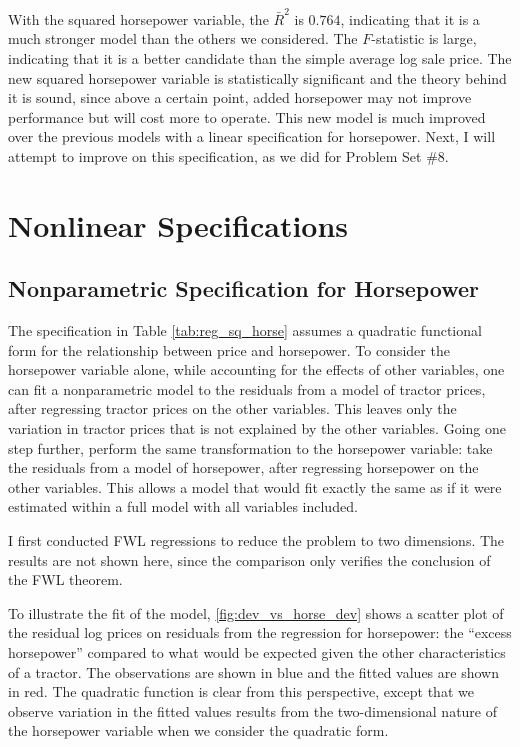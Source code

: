With the squared horsepower variable, the $\bar{R}^2$ is $0.764$, indicating that it is a much stronger model than the others we considered. 
The $F$-statistic is large, indicating that it is a better candidate than the simple average log sale price. 
The new squared horsepower variable is statistically significant and the theory behind it is sound, since above a certain point, added horsepower may not improve performance but will cost more to operate. 
This new model is much improved over the previous models with a linear specification for horsepower.
Next, I will attempt to improve on this specification, 
as we did for Problem Set \#8. 





\clearpage
\section{Nonlinear Specifications}


\subsection{Nonparametric Specification for Horsepower}


The specification in 
Table \ref{tab:reg_sq_horse}
assumes a quadratic functional form for
the relationship between price and horsepower. 
To consider the horsepower variable alone, 
while accounting for the effects of other variables, 
one can fit a nonparametric model to the residuals 
from a model of tractor prices, 
after regressing tractor prices on the other variables. 
This leaves only the variation in tractor prices that is not explained by the other variables. 
Going one step further, perform the same transformation to the horsepower variable:
take the residuals from a model of horsepower, 
after regressing horsepower on the other variables. 
This allows a model that would fit exactly the same as if it were estimated within a full model with all variables included. 

I first conducted FWL regressions 
to reduce the problem to two dimensions. 
The results are not shown here, 
since the comparison only verifies 
the conclusion of the FWL theorem. 


To illustrate the fit of the model, 
\ref{fig:dev_vs_horse_dev} 
shows a scatter plot 
of the residual log prices on 
residuals from the regression for horsepower:
the ``excess horsepower'' compared to what would be 
expected given the other characteristics of a tractor. 
The observations are shown in blue
and the fitted values are shown in red.
The quadratic function is clear from this perspective, 
except that we observe variation in the fitted values results from the 
two-dimensional nature of the horsepower variable
when we consider the quadratic form.

